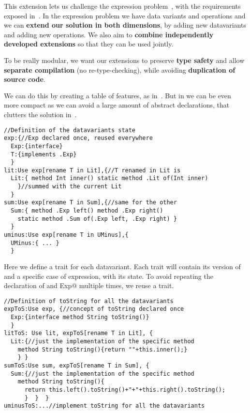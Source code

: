 This extension lets us challenge the expression problem~\cite{wadler1998expression},
with the requirements exposed in~\cite{scala}.
In the expression problem we have data variants and operations and we can
\textbf{extend our solution in both dimensions},
by adding new datavariants and adding new operations.
We also aim to \textbf{combine independently developed extensions} so
that they can be used jointly.

To be really modular, we want our extensions to
preserve \textbf{type safety}
and allow \textbf{separate compilation} (no re-type-checking),
while avoiding \textbf{duplication of source code}.

We can do this by creating a table of features, as in~\cite{Deepfjig}.
But in \name we can be even more compact as we can avoid a large amount of abstract declarations,
that clutters the solution in~\cite{Deepfjig}.


\begin{lstlisting}
//Definition of the datavariants state
exp:{//Exp declared once, reused everywhere
  Exp:{interface}
  T:{implements .Exp}
  }
lit:Use exp[rename T in Lit],{//T renamed in Lit is 
  Lit:{ method Int inner() static method .Lit of(Int inner)
    }//summed with the current Lit
  }
sum:Use exp[rename T in Sum],{//same for the other
  Sum:{ method .Exp left() method .Exp right()
    static method .Sum of(.Exp left, .Exp right) }
  }
uminus:Use exp[rename T in UMinus],{
  UMinus:{ ... }
  }

\end{lstlisting}
Here we define a trait for each datavariant.
Each trait will contain its version of \Q@Exp@
and a specific case of expression, with its state.
 To avoid repeating the declaration of \Q@Exp@ 
and \Q@implements Exp@ multiple times, we reuse
a \Q@exp@ trait.

\begin{lstlisting}
//Definition of toString for all the datavariants
expToS:Use exp, {//concept of toString declared once
  Exp:{interface method String toString()}
  }
litToS: Use lit, expToS[rename T in Lit], {
  Lit:{//just the implementation of the specific method
    method String toString(){return ""+this.inner();}
    } }
sumToS:Use sum, expToS[rename T in Sum], {
  Sum:{//just the implementation of the specific method
    method String toString(){
      return this.left().toString()+"+"+this.right().toString();
      }  }  }
uminusToS:...//implement toString for all the datavariants
\end{lstlisting}

